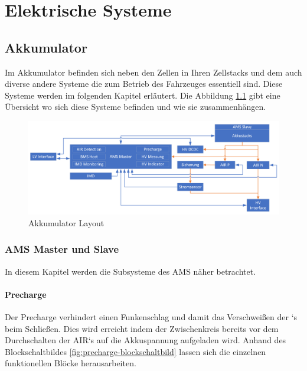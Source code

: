 
\chapter{Elektrische Systeme}
\FloatBarrier
\section{Akkumulator}
Im Akkumulator befinden sich neben den Zellen in Ihren Zellstacks und dem  auch diverse andere Systeme die zum Betrieb des Fahrzeuges essentiell sind. Diese Systeme werden im folgenden Kapitel erläutert. Die Abbildung \ref{fig:accumulator-layout} gibt eine Übersicht wo sich diese Systeme befinden und wie sie zusammenhängen.

\begin{figure}
	\centering
	\includegraphics[width=1\linewidth]{"bilder/Accumulator Layout"}
	\caption{Akkumulator Layout}
	\label{fig:accumulator-layout}
\end{figure}

\FloatBarrier
\subsection{\ac{AMS} Master und Slave}
In diesem Kapitel werden die Subsysteme des \ac{AMS} näher betrachtet.
\FloatBarrier

\subsubsection{Precharge}
Der Precharge verhindert einen Funkenschlag und damit das Verschweißen der `s beim Schließen. Dies wird erreicht indem der Zwischenkreis bereits vor dem Durchschalten der \ac{AIR}`s auf die Akkuspannung aufgeladen wird. Anhand des Blockschaltbildes \ref{fig:precharge-blockschaltbild} lassen sich die einzelnen funktionellen Blöcke herausarbeiten.

